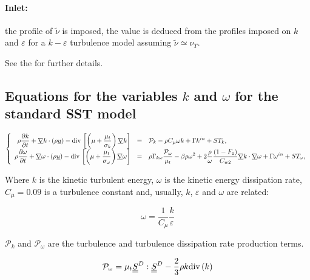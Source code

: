 \paragraph{Inlet:}
the profile of $\tilde{\nu}$ is imposed, the value is deduced from the profiles imposed on $k$ and $\varepsilon$ for a $k-\varepsilon$ turbulence
model assuming $\tilde{\nu } \simeq \nu_T$.

See the  for further details.

\subsection{Equations for the variables $k$ and $\omega$ for the standard SST model}

\begin{equation}
\left\{
\begin{array}{r c l}
\displaystyle
\rho \dfrac{\partial k }{\partial t} + \underline{\nabla} k \cdot \left( \rho \underline{u} \right)
- \text{div}\, \left[ \left( \mu +\frac{\mu _{t}}{\sigma _{k}} \right)\underline{\nabla}{k}\right]
&=&\displaystyle
\mathcal{P}_k -\rho C_{\mu}\omega k +\Gamma k^{in}+ST_{k}, \\
\displaystyle
\rho \dfrac{\partial  \omega}{\partial t} + \underline{\nabla} \omega \cdot \left(\rho \underline{u} \right)
-\text{div}\, \left[ \left( \mu +\frac{\mu _{t}}{\sigma _{\omega}} \right) \underline{\nabla}{\omega}\right]
&=& \displaystyle
\rho \Gamma_{k\omega} \frac{\mathcal{P}_{\omega}}{\mu_t} - \beta \rho \omega^2
+ 2\frac{\rho}{\omega} \frac{(1 - F_1)}{C_{w2}} \underline{\nabla}{k}\cdot\underline{\nabla}{\omega}+\Gamma \omega^{in}+ST_{\omega},
\end{array}
\right.
\end{equation}

Where $k$ is the kinetic turbulent energy, $\omega$ is the kinetic energy dissipation rate, $C_{\mu} = 0.09$ is a turbulence constant and, usually, $k$, $\varepsilon$ and $\omega$ are related:

\begin{equation}
\omega = \frac{1}{C_{\mu}}\frac{k}{\varepsilon}
\end{equation}

$\mathcal{P}_k$ and $\mathcal{P}_{\omega}$ are the turbulence and turbulence dissipation rate production terms.

\begin{equation}
\mathcal{P}_{\omega} = \mu_t \underline{\underline{S}}^D:\underline{\underline{S}}^D - \frac{2}{3}\rho k \text{div}\,(k)
\end{equation}

